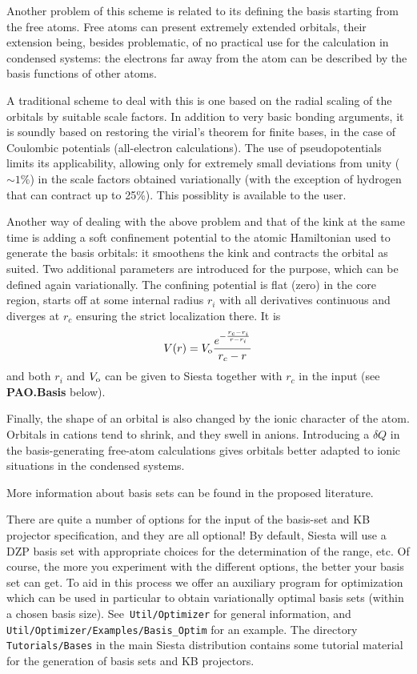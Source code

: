 \documentclass[11pt]{article}
\begin{document}
Another problem of this scheme is related to its defining the basis
starting from the free atoms.  Free atoms can present extremely extended
orbitals, their extension being, besides problematic, of no practical
use for the calculation in condensed systems: the electrons far away
from the atom can be described by the basis functions of other atoms.

A traditional scheme to deal with this is one based on the radial
scaling of the orbitals by suitable scale factors.  In addition to
very basic bonding arguments, it is soundly based on restoring
the virial's theorem for finite bases, in the case of Coulombic potentials
(all-electron calculations).  The use of pseudopotentials limits its
applicability, allowing only for extremely small deviations from unity
($\sim 1\%$) in the scale factors obtained variationally (with the
exception of hydrogen that can contract up to 25\%). This possiblity
is available to the user.

Another way of dealing with the above problem and that of the kink at the
same time is adding a soft confinement potential to the atomic
Hamiltonian used to generate the basis orbitals: it smoothens the kink
and contracts the orbital as suited. Two additional parameters are
introduced for the purpose, which can be defined again variationally.
The confining potential is flat (zero) in the core region, starts off
at some internal radius $r_i$ with all derivatives continuous and
diverges at $r_c$ ensuring the strict localization there.  It is
\begin{equation}
  V(r) = V_{\rm o} { e^{- { {r_c - r_i} \over {r - r_i} } } \over {r_c -r} }
\end{equation}
and both $r_i$ and $V_{\rm o}$ can be given to {\sc Siesta} together
with $r_c$ in the input (see {\bf PAO.Basis} below).

Finally, the shape of an orbital is also changed by the ionic
character of the atom.  Orbitals in cations tend to shrink, and they
swell in anions.  Introducing a $\delta Q$ in the basis-generating
free-atom calculations gives orbitals better adapted to ionic
situations in the condensed systems.

More information about basis sets can be found in the proposed
literature.


\noindent

There are quite a number of options for the input of the basis-set and
KB projector specification, and they are all optional! By default,
{\sc Siesta} will use a DZP basis set with appropriate choices for the
determination of the range, etc. Of course, the more you experiment
with the different options, the better your basis set can get. To aid
in this process we offer an auxiliary program for optimization which
can be used in particular to obtain variationally optimal basis sets
(within a chosen basis size). See {\tt Util/Optimizer}
for general information, and {\tt Util/Optimizer/Examples/Basis\_Optim}
for an example. The directory {\tt Tutorials/Bases} in the main {\sc Siesta
distribution} contains some tutorial material for the generation of
basis sets and KB projectors.
\end{document}
